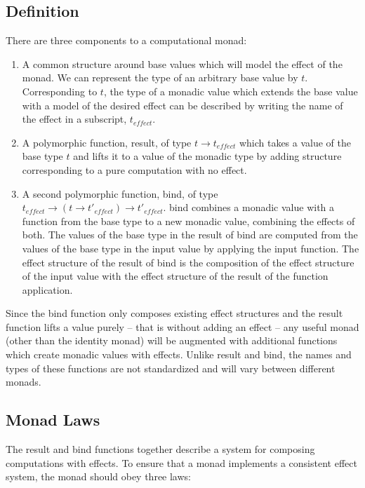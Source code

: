 \documentclass[natbib,10pt]{sigplanconf}
\begin{document}
\subsection{Definition}

There are three components to a computational monad:
\begin{enumerate}
\item
A common structure around base values which will model the
effect of the monad.  We can represent the type of an arbitrary
base value by $t$. Corresponding to $t$, the type of a monadic
value which extends the base value with a model of the desired
effect can be described by writing the name of the effect
in a subscript, $t_{effect}$.

\item
A polymorphic function, {\mono result}, of type $t \rightarrow t_{effect}$
which takes a value of the base type $t$ and lifts it to a value of the
monadic type by adding structure corresponding to a pure computation
with no effect.

\item
A second polymorphic function, {\mono bind}, of type
$t_{effect} \rightarrow (t \rightarrow t'_{effect}) \rightarrow t'_{effect}$.
{\mono bind} combines a monadic value with a function from the base type to
a new monadic value, combining the effects of both.  The values of the base
type in the result of {\mono bind} are computed from the values of the base type
in the input value by applying the input function.  The effect structure
of the result of {\mono bind} is the composition of the effect structure
of the input value with the effect structure of the result of the function
application.
\end{enumerate}

Since the {\mono bind} function only composes existing effect structures
and the {\mono result} function lifts a value purely -- that is without
adding an effect -- any useful monad (other than the identity monad)
will be augmented with additional functions which create monadic
values with effects.  Unlike {\mono result} and {\mono bind}, the names
and types of these functions are not standardized and will vary
between different monads.

\subsection{Monad Laws}

The {\mono result} and {\mono bind} functions together describe a system
for composing computations with effects.  To ensure that a monad
implements a consistent effect system, the monad should obey three laws:
\end{document}
